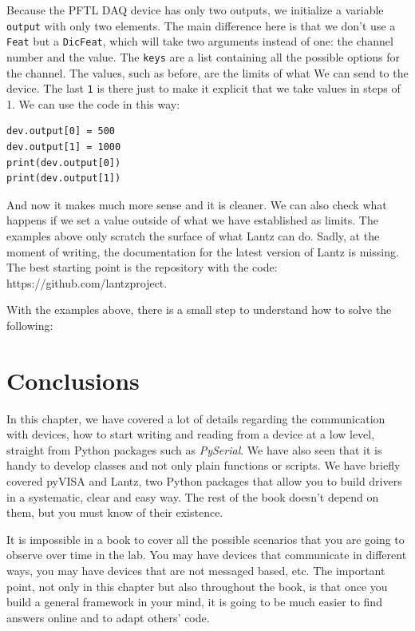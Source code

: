 Because the {PFTL DAQ} device has only two outputs, we initialize a variable \texttt{output} with only two elements. The main difference here is that we don't use a \texttt{Feat} but a \texttt{DicFeat}, which will take two arguments instead of one: the channel number and the value. The \texttt{keys} are a list containing all the possible options for the channel. The values, such as before, are the limits of what We can send to the device. The last \texttt{1} is there just to make it explicit that we take values in steps of 1. We can use the code in this way:

\begin{verbatim}
dev.output[0] = 500
dev.output[1] = 1000
print(dev.output[0])
print(dev.output[1])
\end{verbatim}

And now it makes much more sense and it is cleaner. We can also check what happens if we set a value outside of what we have established as limits. The examples above only scratch the surface of what Lantz can do. Sadly, at the moment of writing, the documentation for the latest version of Lantz is missing. The best starting point is the repository with the code: https://github.com/lantzproject.

With the examples above, there is a small step to understand how to solve the following:


\section{Conclusions}\label{section:conclusions}
In this chapter, we have covered a lot of details regarding the communication with devices, how to start writing and reading from a device at a low level, straight from Python packages such as \emph{PySerial}. We have also seen that it is handy to develop classes and not only plain functions or scripts. We have briefly covered pyVISA and Lantz, two Python packages that allow you to build drivers in a systematic, clear and easy way. The rest of the book doesn't depend on them, but you must know of their existence. 

It is impossible in a book to cover all the possible scenarios that you are going to observe over time in the lab. You may have devices that communicate in different ways, you may have devices that are not messaged based, etc. The important point, not only in this chapter but also throughout the book, is that once you build a general framework in your mind, it is going to be much easier to find answers online and to adapt others' code.

